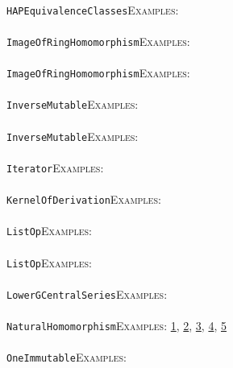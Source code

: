 \documentclass[a4paper,11pt]{report}
\begin{document}
{{ \\
 \texttt{HAP{\textunderscore}EquivalenceClasses}{\nobreakspace}{\nobreakspace}{\nobreakspace}{\nobreakspace}\textsc{Examples:} \\
 \\
 \texttt{ImageOfRingHomomorphism}{\nobreakspace}{\nobreakspace}{\nobreakspace}{\nobreakspace}\textsc{Examples:} \\
 \\
 \texttt{ImageOfRingHomomorphism}{\nobreakspace}{\nobreakspace}{\nobreakspace}{\nobreakspace}\textsc{Examples:} \\
 \\
 \texttt{InverseMutable}{\nobreakspace}{\nobreakspace}{\nobreakspace}{\nobreakspace}\textsc{Examples:} \\
 \\
 \texttt{InverseMutable}{\nobreakspace}{\nobreakspace}{\nobreakspace}{\nobreakspace}\textsc{Examples:} \\
 \\
 \texttt{Iterator}{\nobreakspace}{\nobreakspace}{\nobreakspace}{\nobreakspace}\textsc{Examples:} \\
 \\
 \texttt{KernelOfDerivation}{\nobreakspace}{\nobreakspace}{\nobreakspace}{\nobreakspace}\textsc{Examples:} \\
 \\
 \texttt{ListOp}{\nobreakspace}{\nobreakspace}{\nobreakspace}{\nobreakspace}\textsc{Examples:} \\
 \\
 \texttt{ListOp}{\nobreakspace}{\nobreakspace}{\nobreakspace}{\nobreakspace}\textsc{Examples:} \\
 \\
 \texttt{LowerGCentralSeries}{\nobreakspace}{\nobreakspace}{\nobreakspace}{\nobreakspace}\textsc{Examples:} \\
 \\
 \texttt{NaturalHomomorphism}{\nobreakspace}{\nobreakspace}{\nobreakspace}{\nobreakspace}\textsc{Examples:} \href{../www/SideLinks/About/aboutParallel.html} {1}{\nobreakspace}, \href{../www/SideLinks/About/aboutCoefficientSequence.html} {2}{\nobreakspace}, \href{../www/SideLinks/About/aboutRosenbergerMonster.html} {3}{\nobreakspace}, \href{../www/SideLinks/About/aboutExtensions.html} {4}{\nobreakspace}, \href{../www/SideLinks/About/aboutTensorSquare.html} {5}{\nobreakspace} \\
 \\
 \texttt{OneImmutable}{\nobreakspace}{\nobreakspace}{\nobreakspace}{\nobreakspace}\textsc{Examples:} \\
}}
\end{document}
